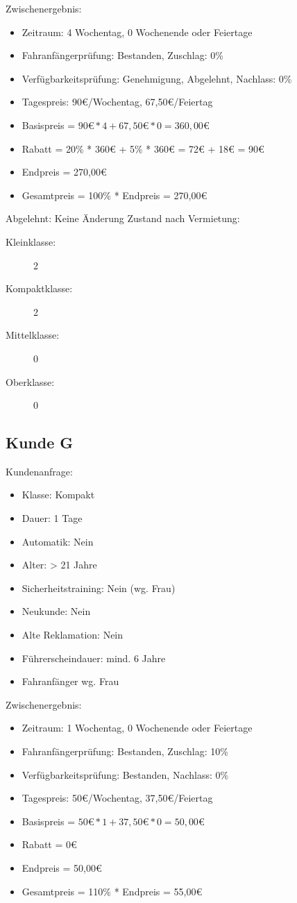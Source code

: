 Zwischenergebnis:
\begin{itemize}
	\item Zeitraum: 4 Wochentag, 0 Wochenende oder Feiertage
	\item Fahranfängerprüfung: Bestanden, Zuschlag: 0\%
	\item Verfügbarkeitsprüfung: Genehmigung, Abgelehnt, Nachlass: 0\%
	\item Tagespreis: 90€/Wochentag, 67,50€/Feiertag
	\item Basispreis = $90€ * 4 + 67,50€ * 0 = 360,00€$
	\item Rabatt = 20\% * 360€ + 5\% * 360€ = 72€ + 18€ = 90€
	\item Endpreis = 270,00€
	\item Gesamtpreis = 100\% * Endpreis = 270,00€
	
\end{itemize}

Abgelehnt: Keine Änderung
Zustand nach Vermietung:
\begin{description}
	\item[Kleinklasse:] 2
	\item[Kompaktklasse:] 2
	\item[Mittelklasse:] 0
	\item[Oberklasse:] 0
\end{description}

\subsection{Kunde G}

Kundenanfrage:
\begin{itemize}
	\item Klasse: Kompakt
	\item Dauer: 1 Tage
	\item Automatik: Nein
	
	\item Alter: > 21 Jahre
	\item Sicherheitstraining: Nein (wg. Frau)
	\item Neukunde: Nein
	\item Alte Reklamation: Nein
	\item Führerscheindauer: mind. 6 Jahre 
	\item Fahranfänger wg. Frau
\end{itemize}

Zwischenergebnis:
\begin{itemize}
	\item Zeitraum: 1 Wochentag, 0 Wochenende oder Feiertage
	\item Fahranfängerprüfung: Bestanden, Zuschlag: 10\%
	\item Verfügbarkeitsprüfung: Bestanden, Nachlass: 0\%
	\item Tagespreis: 50€/Wochentag, 37,50€/Feiertag
	\item Basispreis = $50€ * 1 + 37,50€ * 0 = 50,00€$
	\item Rabatt = 0€
	\item Endpreis = 50,00€
	\item Gesamtpreis = 110\% * Endpreis = 55,00€
\end{itemize}


